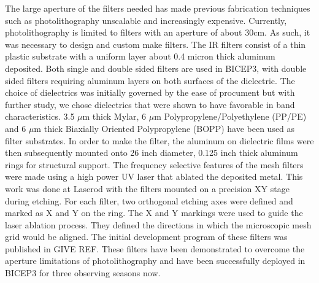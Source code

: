 \documentclass[12pt]{article}
\begin{document}
The large aperture of the filters needed has made previous fabrication techniques such as photolithography unscalable and increasingly expensive. Currently, photolithography is limited to filters with an aperture of about 30cm. As such, it was necessary to design and custom make filters. The IR filters consist of a thin plastic substrate with a uniform layer about 0.4 micron thick aluminum deposited. Both single and double sided filters are used in BICEP3, with double sided filters requiring aluminum layers on both surfaces of the dielectric. The choice of dielectrics was initially governed by the ease of procument but with further study, we chose dielectrics that were shown to have favorable in band characteristics. 3.5 $\mu$m thick Mylar, 6 $\mu$m Polypropylene/Polyethylene (PP/PE) and 6 $\mu$m thick Biaxially Oriented Polypropylene (BOPP) have been used as filter substrates. In order to make the filter, the aluminum on dielectric films were then subsequently mounted onto 26 inch diameter, 0.125 inch thick aluminum rings for structural support.  The frequency selective features of the mesh filters were made using a high power UV laser that ablated the deposited metal. This work was done at Laserod with the filters mounted on a precision XY stage during etching. For each filter, two orthogonal etching axes were defined and marked as X and Y on the ring. The X and Y markings were used to guide the laser ablation process. They defined the directions in which the microscopic mesh grid would be aligned. The initial development program of these filters was published in GIVE REF. These filters have been demonstrated to overcome the aperture limitations of photolithography and have been successfully deployed in BICEP3 for three observing seasons now. 
\end{document}
